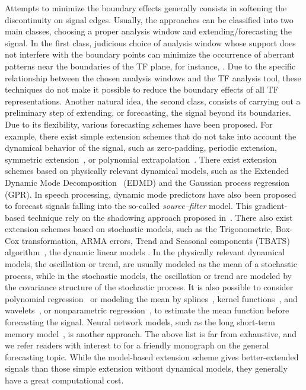 \documentclass[journal]{IEEEtran}
\begin{document}
Attempts to minimize the boundary effects generally consists in softening the discontinuity on signal edges. Usually, the approaches can be classified into two main classes, choosing a proper analysis window and extending/forecasting the signal. In the first class, judicious choice of analysis window whose support does not interfere with the boundary points can minimize the occurrence of aberrant patterns near the boundaries of the TF plane, for instance, \cite{Chui92wavelets,Depczynski99fast}. Due to the specific relationship between the chosen analysis windows and the TF analysis tool, these techniques do not make it possible to reduce the boundary effects of all TF representations. 
%
Another natural idea, the second class, consists of carrying out a preliminary step of extending, or forecasting, the signal beyond its boundaries. Due to its flexibility, various forecasting schemes have been proposed. For example, there exist simple extension schemes that do not take into account the dynamical behavior of the signal, such as zero-padding, periodic extension, symmetric extension~\cite{Kharitonenko02wavelet,Chen95symmetric}, or polynomial extrapolation~\cite{Williams97discrete}. 
%
There exist extension schemes based on physically relevant dynamical models, such as the Extended Dynamic Mode Decomposition~\cite{Williams15data} (EDMD) and the Gaussian process regression~\cite{Rasmussen06gaussian,Roberts13Gaussian} (GPR).
%
{\color{red}
In speech processing, dynamic mode predictors have also been proposed~\cite{Vargas11speech} to forecast signals falling into the so-called \textit{source--filter} model. This gradient-based technique rely on the shadowing approach proposed in~\cite{Grebogi90shadowing}.
}
%
There also exist extension schemes based on stochastic models, such as the Trigonometric, Box-Cox transformation, ARMA errors, Trend and Seasonal components (TBATS) algorithm~\cite{DeLivera11forecasting}, the dynamic linear models \cite{west2006bayesian}. 
%
In the physically relevant dynamical models, the oscillation or trend, are usually modeled as the mean of a stochastic process, while in the stochastic models, the oscillation or trend are modeled by the covariance structure of the stochastic process. 
It is also possible to consider polynomial regression~\cite{fan1996local} or modeling the mean by splines~\cite{hall2005theory}, kernel functions~\cite{chang2010training}, and wavelets~\cite{marron1998exact}, or nonparametric regression~\cite{fan1996local}, to estimate the mean function before forecasting the signal. Neural network models, such as the long short-term memory model~\cite{vlachas2018data}, is another approach. 
%
The above list is far from exhaustive, and we refer readers with interest to \cite{hyndman2018forecasting} for a friendly monograph on the general forecasting topic. 
%
While the model-based extension scheme gives better-extended signals than those simple extension without dynamical models, they generally have a great computational cost. 
\end{document}

